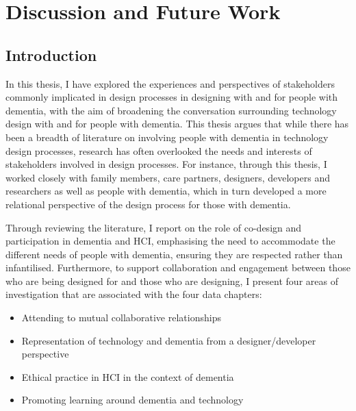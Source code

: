 \chapter{Discussion and Future Work}
\label{Discussion}

\section{Introduction}
\label{Discussion:Intro}

In this thesis, I have explored the experiences and perspectives of stakeholders commonly implicated in design processes in designing with and for people with dementia, with the aim of broadening the conversation surrounding technology design with and for people with dementia. This thesis argues that while there has been a breadth of literature on involving people with dementia in technology design processes, research has often overlooked the needs and interests of stakeholders involved in design processes. For instance, through this thesis, I worked closely with family members, care partners, designers, developers and researchers as well as people with dementia, which in turn developed a more relational perspective of the design process for those with dementia.

Through reviewing the literature, I report on the role of co-design and participation in dementia and HCI, emphasising the need to accommodate the different needs of people with dementia, ensuring they are respected rather than infantilised. Furthermore, to support collaboration and engagement between those who are being designed for and those who are designing, I present four areas of investigation that are associated with the four data chapters: 
\begin{itemize}
    \item Attending to mutual collaborative relationships
    \item Representation of technology and dementia from a designer/developer perspective
    \item Ethical practice in HCI in the context of dementia
    \item Promoting learning around dementia and technology
\end{itemize}

